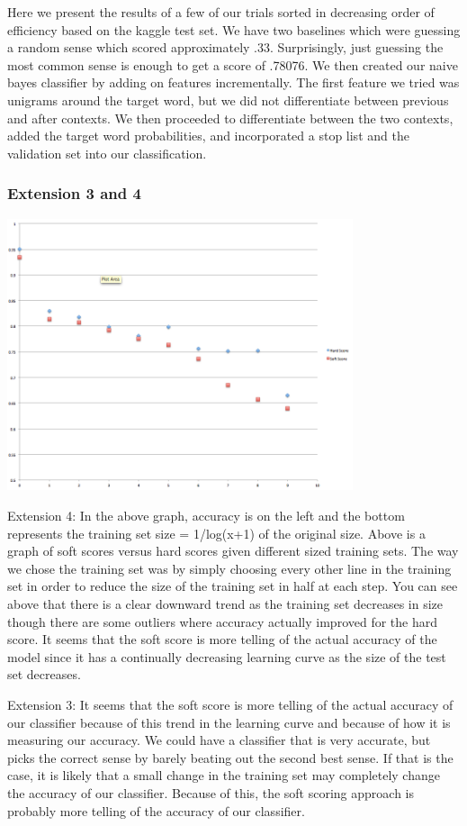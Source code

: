 \documentclass[11pt]{article}
\begin{document}
Here we present the results of a few of our trials sorted in decreasing order of efficiency based on the kaggle test set. We have two baselines which were guessing a random sense which scored approximately .33. Surprisingly, just guessing the most common sense is enough to get a score of .78076. We then created our naive bayes classifier by adding on features incrementally. The first feature we tried was unigrams around the target word, but we did not differentiate between previous and after contexts. We then proceeded to differentiate between the two contexts, added the target word probabilities, and incorporated a stop list and the validation set into our classification.

\subsubsection{Extension 3 and 4}
\includegraphics[width = 4in]{data_plot.png}

Extension 4: In the above graph, accuracy is on the left and the bottom represents the training set size = 1/log(x+1) of the original size.
Above is a graph of soft scores versus hard scores given different sized training sets. The way we chose the training set was by simply choosing every other line in the training set in order to reduce the size of the training set in half at each step. You can see above that there is a clear downward trend as the training set decreases in size though there are some outliers where accuracy actually improved for the hard score. It seems that the soft score is more telling of the actual accuracy of the model since it has a continually decreasing learning curve as the size of the test set decreases.

Extension 3:  It seems that the soft score is more telling of the actual accuracy of our classifier because of this trend in the learning curve and because of how it is measuring our accuracy. We could have a classifier that is very accurate, but picks the correct sense by barely beating out the second best sense. If that is the case, it is likely that a small change in the training set may completely change the accuracy of our classifier. Because of this, the soft scoring approach is probably more telling of the accuracy of our classifier.
\end{document}
